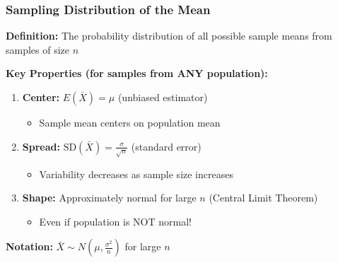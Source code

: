 \documentclass{beamer}
\begin{document}
\begin{frame}
\frametitle{Sampling Distribution of the Mean}
\textbf{Definition:} The probability distribution of all possible sample means from samples of size $n$

\vspace{0.5cm}
\textbf{Key Properties (for samples from ANY population):}
\begin{enumerate}
\item \textbf{Center:} $E(\bar{X}) = \mu$ (unbiased estimator)
  \begin{itemize}
  \item Sample mean centers on population mean
  \end{itemize}

\item \textbf{Spread:} $\text{SD}(\bar{X}) = \frac{\sigma}{\sqrt{n}}$ (standard error)
  \begin{itemize}
  \item Variability decreases as sample size increases
  \end{itemize}

\item \textbf{Shape:} Approximately normal for large $n$ (Central Limit Theorem)
  \begin{itemize}
  \item Even if population is NOT normal!
  \end{itemize}
\end{enumerate}

\vspace{0.5cm}
\textbf{Notation:} $\bar{X} \sim N\left(\mu, \frac{\sigma^2}{n}\right)$ for large $n$
\end{frame}
\end{document}
